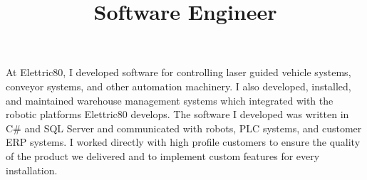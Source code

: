 \title{\textbf{Software Engineer}}
\begin{position}
At Elettric80, I developed software for controlling laser guided
vehicle systems, conveyor systems, and other automation machinery. I also
developed, installed, and maintained warehouse management systems which
integrated with the robotic platforms Elettric80 develops. The software I
developed was written in C\# and SQL Server and communicated with robots,
PLC systems, and customer ERP systems. I worked directly with high profile
customers to ensure the quality of the product we delivered and to implement
custom features for every installation.
\end{position}

